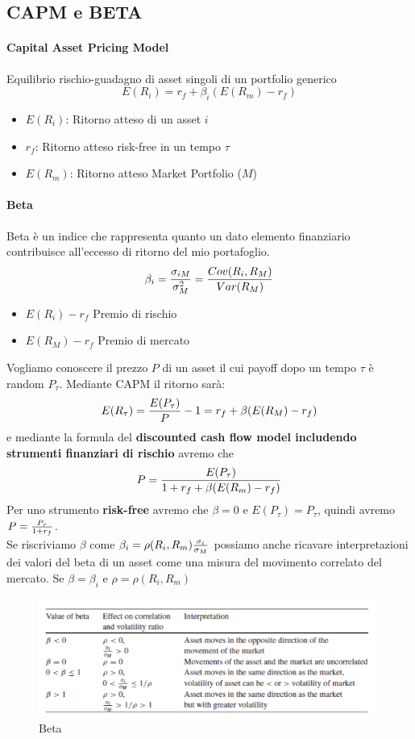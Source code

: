 \documentclass[12pt]{article}
\begin{document}
\subsection{CAPM e BETA}
\paragraph{Capital Asset Pricing Model} Equilibrio rischio-guadagno di asset singoli di un portfolio generico
$$E(R_i)=r_f + \beta _i(E(R_m)-r_f)$$
\begin{itemize}
    \item $E(R_i)$: Ritorno atteso di un asset $i$
    \item $r_f$: Ritorno atteso risk-free in un tempo $\tau$
    \item $E(R_m)$: Ritorno atteso Market Portfolio ($M$)
\end{itemize}
\paragraph{Beta} Beta è un indice che rappresenta quanto un dato elemento finanziario contribuisce all’eccesso di ritorno del mio portafoglio.
$$\beta _i={{\sigma_{iM}}\over{\sigma_M^2}}={{Cov(R_i,R_M)}\over{Var(R_M)}}$$
\begin{itemize}
    \item $E(R_i)-r_f$ Premio di rischio
    \item $E(R_M)-r_f$ Premio di mercato
\end{itemize}
Vogliamo conoscere il prezzo $P$ di un asset il cui payoff dopo un tempo $\tau$ è random $P_\tau$. Mediante CAPM il ritorno sarà:
$$E(R_\tau)={E(P_\tau)\over P}-1=r_f+\beta (E(R_M)-r_f)$$
e mediante la formula del \textbf{discounted cash flow model includendo strumenti finanziari di rischio} avremo che
$$P={{E(P_\tau)}\over{1+r_f+\beta(E(R_m)-r_f)}}$$
Per uno strumento \textbf{risk-free} avremo che $\beta=0$ e $E(P_\tau)=P_\tau$, quindi avremo $P={P_\tau \over {1+r_f}}$.\\
Se riscriviamo $\beta$ come $\beta_i=\rho(R_i,R_m){\sigma_i\over \sigma_M}$ possiamo anche ricavare interpretazioni dei valori del beta di un asset come una misura del movimento correlato del mercato. Se $\beta=\beta _i$ e $\rho = \rho(R_i,R_m)$
\begin{figure}[!htb]
    \centering
    \includegraphics[width=1\textwidth]{images/beta.png}
    \caption{Beta}
\end{figure}
\FloatBarrier
\end{document}
